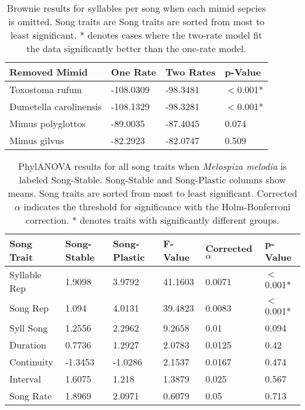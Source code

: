 \documentclass[a4paper,12pt]{article}
\begin{document}
\begin{table}[ht]
\caption{Brownie results for syllables per song when each mimid sepcies is omitted. Song traits are Song traits are sorted from most to least significant. * denotes cases where the two-rate model fit the data significantly better than the one-rate model.}
\centering
\begin{tabular}{llll}
  \hline
Removed Mimid & One Rate & Two Rates & p-Value \\ 
  \hline
Toxostoma rufum & -108.0309 & -98.3481 & $<$0.001* \\ 
  Dumetella carolinensis & -108.1329 & -98.3281 & $<$0.001* \\ 
  Mimus polyglottos & -89.0035 & -87.4045 & 0.074 \\ 
  Mimus gilvus & -82.2923 & -82.0747 & 0.509 \\ 
   \hline
\end{tabular}
\end{table}


\begin{table}[ht]
\caption{PhylANOVA results for all song traits when \textit{Melospiza melodia} is labeled Song-Stable. Song-Stable and Song-Plastic columns show means. Song traits are sorted from most to least significant. Corrected $\alpha$ indicates the threshold for significance with the Holm-Bonferroni correction. * denotes traits with significantly different groups.}
\centering
\begin{tabular}{llllll}
  \hline
Song Trait & Song-Stable & Song-Plastic & F-Value & Corrected $\alpha$ & p-Value \\ 
  \hline
Syllable Rep & 1.9098 & 3.9792 & 41.1603 & 0.0071 & $<$0.001* \\ 
  Song Rep & 1.094 & 4.0131 & 39.4823 & 0.0083 & $<$0.001* \\ 
  Syll Song & 1.2556 & 2.2962 & 9.2658 & 0.01 & 0.094 \\ 
  Duration & 0.7736 & 1.2927 & 2.0783 & 0.0125 & 0.42 \\ 
  Continuity & -1.3453 & -1.0286 & 2.1537 & 0.0167 & 0.474 \\ 
  Interval & 1.6075 & 1.218 & 1.3879 & 0.025 & 0.567 \\ 
  Song Rate & 1.8969 & 2.0971 & 0.6079 & 0.05 & 0.713 \\ 
   \hline
\end{tabular}
\end{table}
\end{document}
